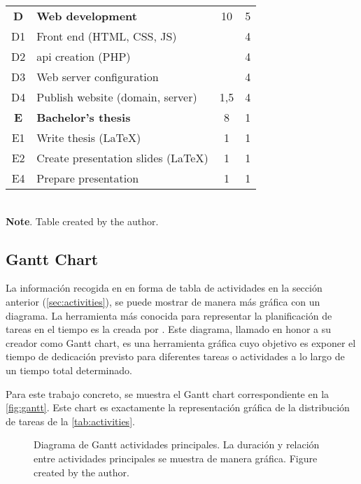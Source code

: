 \begin{table}[p]
\begin{tabular}{cp{}cc}
    \textbf{D} & \textbf{Web development}         & 10  & 5 \\
    D1         & Front end (HTML, CSS, JS)        &     & 4 \\
    D2         & \Acs{api} creation  (PHP)        &     & 4 \\
    D3         & Web server configuration         &     & 4 \\
    D4         & Publish website (domain, server) & 1,5 & 4 \\
    \midrule

    \rowcolor{rowColor}
    \textbf{E} & \textbf{Bachelor's thesis} & 8 & 1 \\
    \rowcolor{rowColor}
    E1         & Write thesis (\LaTeX)       & 1 & 1 \\
    \rowcolor{rowColor}
    \rowcolor{rowColor}
    E2         & Create presentation slides (\LaTeX) & 1 & 1 \\
    \rowcolor{rowColor}
    E4         & Prepare presentation       & 1 & 1 \\
    \bottomrule
  \end{tabular} \\[1.25ex]
  {\small\textbf{Note}. Table created by the author.}
\end{table}


\subsection{Gantt Chart}\label{sec:gantt}

La información recogida en en forma de tabla de actividades en la sección
anterior (\vref{sec:activities}), se puede mostrar de manera más gráfica con un
diagrama. La herramienta más conocida para representar la planificación de
tareas en el tiempo es la creada por
. Este diagrama, llamado en
honor a su creador como Gantt chart, es una herramienta gráfica cuyo objetivo
es exponer el tiempo de dedicación previsto para diferentes tareas o
actividades a lo largo de un tiempo total determinado.

Para este trabajo concreto, se muestra el Gantt chart correspondiente en la
\vref{fig:gantt}. Este chart es exactamente la representación gráfica de la
distribución de tareas de la \vref{tab:activities}.

\begin{figure}[ht]
  \centering
  
  \caption[Diagrama de Gantt actividades principales]{Diagrama de Gantt
    actividades principales. La duración y relación entre actividades
    principales se muestra de manera gráfica. Figure created by the
    author.}\label{fig:gantt}
\end{figure}


